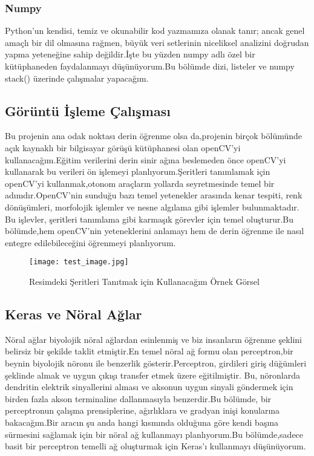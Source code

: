 \documentclass{article}
\begin{document}
\subsubsection{Numpy}Python'un kendisi, temiz ve okunabilir kod yazmamıza olanak tanır; ancak genel amaçlı bir dil olmasına rağmen, büyük veri setlerinin niceliksel analizini doğrudan yapma yeteneğine sahip değildir.İşte bu yüzden numpy adlı özel bir kütüphaneden faydalanmayı düşünüyorum.Bu bölümde dizi, listeler ve numpy stack() üzerinde çalışmalar yapacağım.\\[15pt]

\subsection{Görüntü İşleme Çalışması}
Bu projenin ana odak noktası derin öğrenme olsa da,projenin birçok bölümünde açık kaynaklı bir bilgisayar görüşü kütüphanesi olan openCV'yi kullanacağım.Eğitim verilerini derin sinir ağına beslemeden önce openCV'yi kullanarak bu verileri ön işlemeyi planlıyorum.Şeritleri tanımlamak için openCV'yi kullanmak,otonom araçların yollarda seyretmesinde temel bir adımdır\cite{madan2022road}.OpenCV'nin sunduğu bazı temel yetenekler arasında kenar tespiti, renk dönüşümleri, morfolojik işlemler ve nesne algılama gibi işlemler bulunmaktadır. Bu işlevler, şeritleri tanımlama gibi karmaşık görevler için temel oluşturur.Bu bölümde,hem openCV'nin yeteneklerini anlamayı hem de derin öğrenme ile nasıl entegre edilebileceğini öğrenmeyi planlıyorum.\\[15pt]
\begin{figure}
  \centering
  \texttt{[image: test\_image.jpg]} %
  \caption{Resimdeki Şeritleri Tanıtmak için Kullanacağım Örnek Görsel}
  \label{fig:resim_etiketi}
\end{figure}


\subsection{Keras ve Nöral Ağlar}
Nöral ağlar biyolojik nöral ağlardan esinlenmiş ve biz insanların öğrenme şeklini belirsiz bir şekilde taklit etmiştir.En temel nöral ağ formu olan perceptron,bir beynin biyolojik nöronu ile benzerlik gösterir.Perceptron, girdileri giriş düğümleri şeklinde almak ve uygun çıkışı transfer etmek üzere eğitilmiştir. Bu, nöronlarda dendritin elektrik sinyallerini alması ve aksonun uygun sinyali göndermek için birden fazla akson terminaline dallanmasıyla benzerdir.Bu bölümde, bir perceptronun çalışma prensiplerine, ağırlıklara ve gradyan inişi konularına bakacağım.Bir aracın şu anda hangi kısmında olduğuna göre kendi başına sürmesini sağlamak için bir nöral ağ kullanmayı planlıyorum.Bu bölümde,sadece basit bir perceptron temelli ağ oluşturmak için Keras'ı kullanmayı düşünüyorum.\\[15pt]
\end{document}
